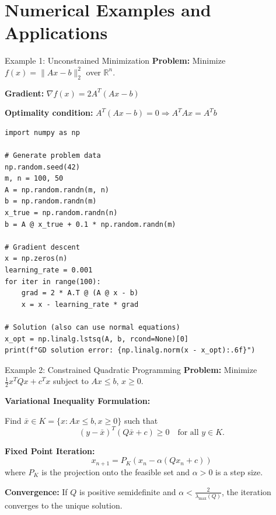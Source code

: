 \documentclass[aspectratio=169,10pt]{beamer}
\begin{document}
\section{Numerical Examples and Applications}

\begin{frame}[fragile]{Example 1: Unconstrained Minimization}
  \textbf{Problem:} Minimize $f(x) = \|Ax - b\|^2_2$ over $\mathbb{R}^n$.

  \vspace{0.3cm}

  \textbf{Gradient:} $\nabla f(x) = 2A^T(Ax - b)$

  \vspace{0.3cm}

  \textbf{Optimality condition:} $A^T(Ax - b) = 0 \Rightarrow A^T A x = A^T b$

  \vspace{0.5cm}

  \begin{lstlisting}[style=mypython]
import numpy as np

# Generate problem data
np.random.seed(42)
m, n = 100, 50
A = np.random.randn(m, n)
b = np.random.randn(m)
x_true = np.random.randn(n)
b = A @ x_true + 0.1 * np.random.randn(m)

# Gradient descent
x = np.zeros(n)
learning_rate = 0.001
for iter in range(100):
    grad = 2 * A.T @ (A @ x - b)
    x = x - learning_rate * grad

# Solution (also can use normal equations)
x_opt = np.linalg.lstsq(A, b, rcond=None)[0]
print(f"GD solution error: {np.linalg.norm(x - x_opt):.6f}")
  \end{lstlisting}
\end{frame}

\begin{frame}{Example 2: Constrained Quadratic Programming}
  \textbf{Problem:} Minimize $\frac{1}{2} x^T Q x + c^T x$ subject to $Ax \leq b$, $x \geq 0$.

  \vspace{0.3cm}

  \textbf{Variational Inequality Formulation:}

  Find $\bar{x} \in K = \{x : Ax \leq b, x \geq 0\}$ such that
  \[
  (y - \bar{x})^T (Q\bar{x} + c) \geq 0 \quad \text{for all } y \in K.
  \]

  \vspace{0.5cm}

  \textbf{Fixed Point Iteration:}
  \[
  x_{n+1} = P_K(x_n - \alpha (Q x_n + c))
  \]
  where $P_K$ is the projection onto the feasible set and $\alpha > 0$ is a step size.

  \vspace{0.5cm}

  \textbf{Convergence:} If $Q$ is positive semidefinite and $\alpha < \frac{2}{\lambda_{\max}(Q)}$, the iteration converges to the unique solution.
\end{frame}
\end{document}
